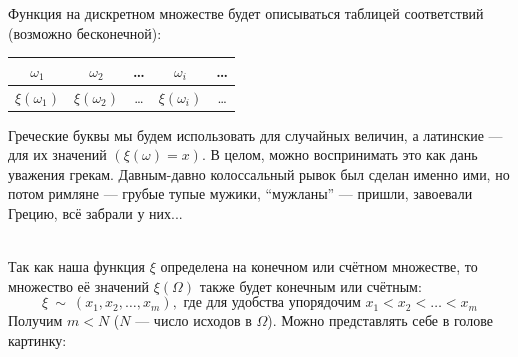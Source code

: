 \documentclass[11pt]{article}
\begin{document}
\begin{definition}
    Функция на дискретном множестве будет описываться таблицей соответствий (возможно бесконечной):
    \begin{table}[h]
    \centering
    \begin{tabular}{|c|c|c|c|c|}
    \hline
    $\omega_1$ & $\omega_2$ & \ldots & $\omega_i$ & \ldots \\
    \hline
    $\xi(\omega_1)$ & $\xi(\omega_2)$ & \ldots & $\xi(\omega_i)$ & \ldots \\
    \hline
    \end{tabular}
    \end{table}
\end{definition}

\begin{remark}
    Греческие буквы мы будем использовать для случайных величин, а латинские --- для их значений $(\xi(\omega) = x)$. 
    В целом, можно воспринимать это как дань уважения грекам. Давным-давно колоссальный рывок был сделан именно ими, но потом римляне --- грубые тупые мужики, ``мужланы'' --- пришли, завоевали Грецию, всё забрали у них...
\end{remark} \leavevmode
\\
Так как наша функция $\xi$ определена на конечном или счётном множестве, то множество её значений $\xi(\Omega)$ также будет конечным или счётным:
\[\xi \ \sim \ (x_1, x_2, \ldots, x_m), \text{ где для удобства упорядочим } x_1 < x_2 < \ldots < x_m\]
Получим $m < N$ ($N$ --- число исходов в $\Omega$). Можно представлять себе в голове картинку: \\
\begin{center}
\end{center} \leavevmode
\end{document}
